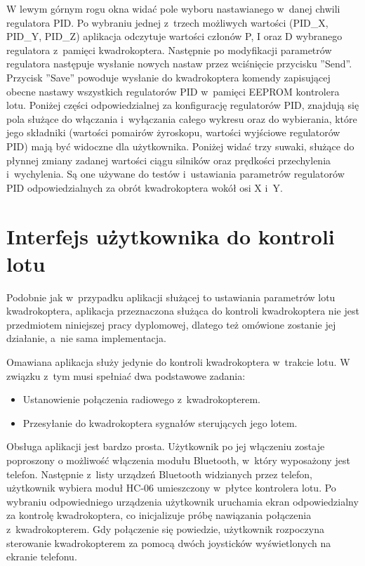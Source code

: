 \documentclass[11pt, twoside]{Thesis} %
\begin{document}
W lewym górnym rogu okna widać pole wyboru nastawianego w~danej chwili regulatora PID. Po wybraniu jednej z~trzech możliwych wartości (PID\_X, PID\_Y, PID\_Z) aplikacja odczytuje wartości członów P, I oraz D wybranego regulatora z~pamięci kwadrokoptera. Następnie po modyfikacji parametrów regulatora następuje wysłanie nowych nastaw przez wciśnięcie przycisku ''Send''. Przycisk ''Save'' powoduje wysłanie do kwadrokoptera komendy zapisującej obecne nastawy wszystkich regulatorów PID w~pamięci EEPROM kontrolera lotu. Poniżej części odpowiedzialnej za konfigurację regulatorów PID, znajdują się pola służące do włączania i~wyłączania całego wykresu oraz do wybierania, które jego składniki (wartości pomairów żyroskopu, wartości wyjściowe regulatorów PID) mają być widoczne dla użytkownika. Poniżej widać trzy suwaki, służące do płynnej zmiany zadanej wartości ciągu silników oraz prędkości przechylenia i~wychylenia. Są one używane do testów i~ustawiania parametrów regulatorów PID odpowiedzialnych za obrót kwadrokoptera wokół osi X i~Y. 


\section{Interfejs użytkownika do kontroli lotu}

Podobnie jak w~przypadku aplikacji służącej to ustawiania parametrów lotu kwadrokoptera, aplikacja przeznaczona służąca do kontroli kwadrokoptera nie jest przedmiotem niniejszej pracy dyplomowej, dlatego też omówione zostanie jej działanie, a~nie sama implementacja.

Omawiana aplikacja służy jedynie do kontroli kwadrokoptera w~trakcie lotu. W związku z~tym musi spełniać dwa podstawowe zadania:
\begin{itemize}
	\item Ustanowienie połączenia radiowego z~kwadrokopterem.
	\item Przesyłanie do kwadrokoptera sygnałów sterujących jego lotem.
\end{itemize}

Obsługa aplikacji jest bardzo prosta. Użytkownik po jej włączeniu zostaje poproszony o możliwość włączenia modułu Bluetooth, w~który wyposażony jest telefon. Następnie z~listy urządzeń Bluetooth widzianych przez telefon, użytkownik wybiera moduł HC-06 umieszczony w~płytce kontrolera lotu. Po wybraniu odpowiedniego urządzenia użytkownik uruchamia ekran odpowiedzialny za kontrolę kwadrokoptera, co inicjalizuje próbę nawiązania połączenia z~kwadrokopterem. Gdy połączenie się powiedzie, użytkownik rozpoczyna sterowanie kwadrokopterem za pomocą dwóch joysticków wyświetlonych na ekranie telefonu.
\end{document}
